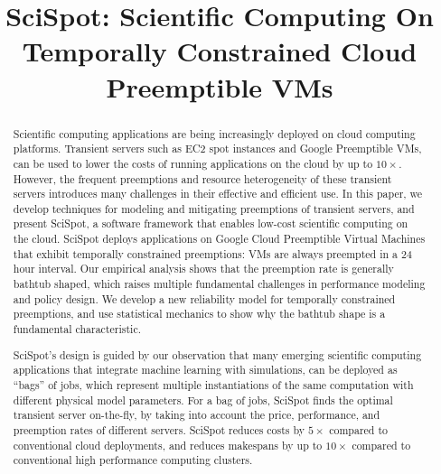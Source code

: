 \documentclass[compsoc]{IEEEtran}
\begin{document}
\title{SciSpot: Scientific Computing On Temporally Constrained Cloud Preemptible VMs}


\author{
  
}
\maketitle 


\begin{abstract}
  Scientific computing applications are being increasingly deployed on cloud computing platforms.
Transient servers such as EC2 spot instances and Google Preemptible VMs, can be used to lower the costs of running applications on the cloud by up to $10\times$. 
However, the frequent preemptions and resource heterogeneity of these transient servers introduces many challenges in their effective and efficient use. 
In this paper, we develop techniques for modeling and mitigating preemptions of transient servers, and present SciSpot, a software framework that enables low-cost scientific computing on the cloud. 
SciSpot deploys applications on Google Cloud Preemptible Virtual Machines that exhibit temporally constrained preemptions: VMs are always preempted in a 24 hour interval. 
Our empirical analysis shows that the preemption rate is generally  bathtub shaped, which raises multiple fundamental challenges in performance modeling and policy design. 
We develop a new reliability model for temporally constrained preemptions, and use statistical mechanics to show why the bathtub shape is a fundamental characteristic. 


SciSpot's design is guided by our observation that many emerging scientific computing applications that integrate machine learning with simulations, can be deployed as ``bags'' of jobs, which represent multiple instantiations of the same computation with different physical model parameters. 
For a bag of jobs, SciSpot finds the optimal transient server on-the-fly, by taking into account the price, performance, and preemption rates of different servers. 
SciSpot reduces costs by $5\times$ compared to conventional cloud deployments, and reduces  makespans by up to $10\times$ compared to conventional high performance computing clusters.
























 \end{abstract}
\end{document}

